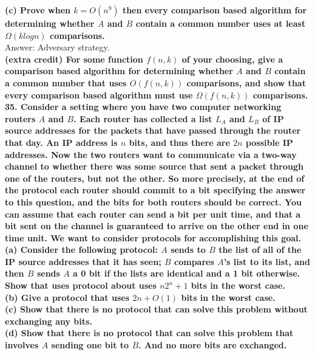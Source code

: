 \documentclass{article}
\begin{document}
\textbf{(c) Prove when $k = O(n^9)$ then every comparison based algorithm for determining
whether $A$ and $B$ contain a common number uses at least $\Omega(klogn)$ comparisons.} \\ \newline
Answer: Adversary strategy. \\ \newline
\textbf{(extra credit) For some function $f(n,k)$ of your choosing, give a comparison based algorithm for determining whether $A$ and $B$ contain a common number that uses $O(f(n,k))$ comparisons, and show that every comparison based algorithm must use $\Omega (f(n,k))$ comparisons.} \\ \newline
\textbf{35. Consider a setting where you have two computer networking routers $A$ and $B$. Each router has collected a list $L_A$ and $L_B$ of IP source addresses for the packets that have passed through the router that day. An IP address is $n$ bits, and thus there are $2n$ possible IP addresses. Now the two routers want to communicate via a two-way channel to whether there was some source that sent a packet through one of the routers, but not the other. So more precisely, at the end of the protocol each router should commit to a bit specifying the answer to this question, and the bits for both routers should be correct. You can assume that each router can send a bit per unit time, and that a bit sent on the channel is guaranteed to arrive on the other end in one time unit. We want to consider protocols for accomplishing this goal.} \\ \newline
\textbf{(a) Consider the following protocol: $A$ sends to $B$ the list of all of the IP source addresses that it has seen; $B$ compares $A$’s list to its list, and then $B$ sends $A$ a 0 bit if the lists are identical and a 1 bit otherwise. Show that uses protocol about uses $n2^n+1$ bits in the worst case.}\\ \newline
\textbf{(b) Give a protocol that uses $2n + O(1)$ bits in the worst case. } \\ \newline
\textbf{(c) Show that there is no protocol that can solve this problem without exchanging any bits.} \\ \newline
\textbf{(d) Show that there is no protocol that can solve this problem that involves $A$ sending one bit to $B$. And no more bits are exchanged.} \\ \newline
\end{document}

